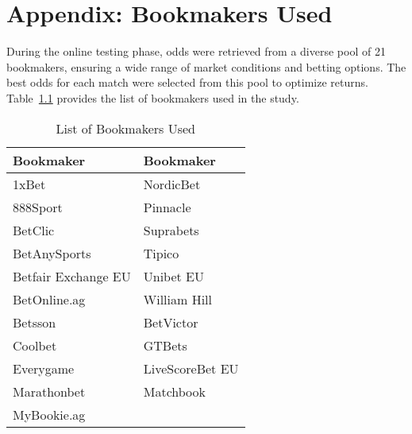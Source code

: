 
\chapter{Appendix: Bookmakers Used}
\label{appendix:bookmaker_used}

During the online testing phase, odds were retrieved from a diverse pool of 21 bookmakers, ensuring a wide range of market conditions and betting options. The best odds for each match were selected from this pool to optimize returns. Table~\ref{tab:bookmakers} provides the list of bookmakers used in the study.

\begin{table}[H]
\centering
\caption{List of Bookmakers Used}
\label{tab:bookmakers}
\begin{tabular}{|l|l|}
\hline
\textbf{Bookmaker}          & \textbf{Bookmaker}        \\ \hline
1xBet                       & NordicBet                 \\ \hline
888Sport                    & Pinnacle                  \\ \hline
BetClic                     & Suprabets                 \\ \hline
BetAnySports                & Tipico                    \\ \hline
Betfair Exchange EU         & Unibet EU                 \\ \hline
BetOnline.ag                & William Hill              \\ \hline
Betsson                     & BetVictor                 \\ \hline
Coolbet                     & GTBets                    \\ \hline
Everygame                   & LiveScoreBet EU           \\ \hline
Marathonbet                 & Matchbook                 \\ \hline
MyBookie.ag                 &                          \\ \hline
\end{tabular}
\end{table}